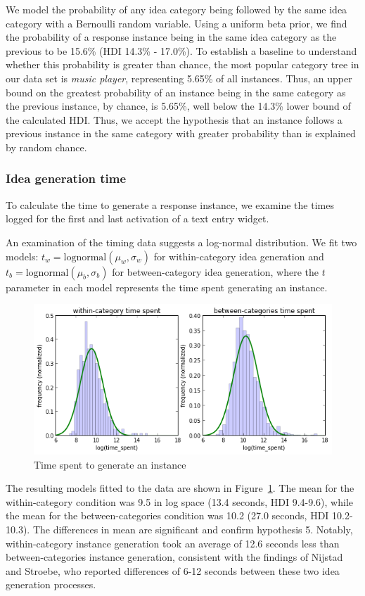 We model the probability of any idea category being followed by the same idea category with a Bernoulli random variable. Using a uniform beta prior, we find the probability of a response instance being in the same idea category as the previous to be 15.6\% (HDI 14.3\% - 17.0\%). To establish a baseline to understand whether this probability is greater than chance, the most popular category tree in our data set is \emph{music player}, representing 5.65\% of all instances. Thus, an upper bound on the greatest probability of an instance being in the same category as the previous instance, by chance, is 5.65\%, well below the 14.3\% lower bound of the calculated HDI. Thus, we accept the hypothesis that an instance follows a previous instance in the same category with greater probability than is explained by random chance.

\subsubsection{Idea generation time}

To calculate the time to generate a response instance, we examine the times logged for the first and last activation of a text entry widget.

An examination of the timing data suggests a log-normal distribution. We fit two models: $t_w = \text{lognormal}(\mu_w, \sigma_w)$ for within-category idea generation and $t_b = \text{lognormal}(\mu_b, \sigma_b)$ for between-category idea generation, where the $t$ parameter in each model represents the time spent generating an instance.

\begin{figure}[h]
    \centering
    \includegraphics[width=0.9\columnwidth]{hyp5_comparison}
    \caption{Time spent to generate an instance}
    \label{fig:hyp5_comparison}
\end{figure}

The resulting models fitted to the data are shown in Figure~\ref{fig:hyp5_comparison}. The mean for the within-category condition was 9.5 in log space (13.4 seconds, HDI 9.4-9.6), while the mean for the between-categories condition was 10.2 (27.0 seconds, HDI 10.2-10.3). The differences in mean are significant and confirm hypothesis 5. Notably, within-category instance generation took an average of 12.6 seconds less than between-categories instance generation, consistent with the findings of Nijstad and Stroebe, who reported differences of 6-12 seconds between these two idea generation processes.

